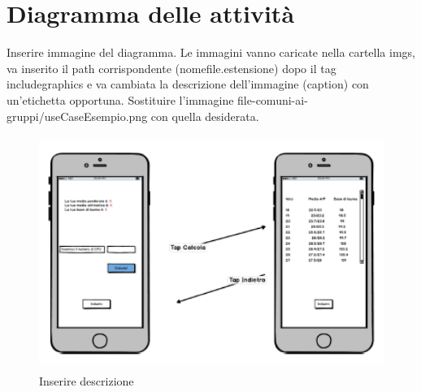 \section{Diagramma delle attività}

Inserire immagine del diagramma. Le immagini vanno caricate nella cartella imgs, va inserito il path corrispondente (nomefile.estensione) dopo il tag includegraphics e va cambiata la descrizione dell'immagine (caption) con un'etichetta opportuna. Sostituire l'immagine file-comuni-ai-gruppi/useCaseEsempio.png con quella desiderata.

\begin{figure}
	\centering
	\includegraphics[height=3in,width=5in]{imgs/file-comuni-ai-gruppi/ActivityDgEsempio.png}
	\caption{Inserire descrizione}
	\label{fig:prova}
\end{figure}

\clearpage